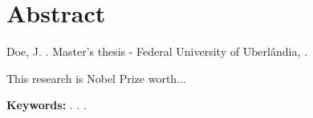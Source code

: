 

\chapter*{Abstract}


\noindent
Doe, J. \emph{\@title}. Master's thesis - Federal University of Uberlândia, \@month { } \@year.
\newline

This research is Nobel Prize worth...

\textbf{Keywords:} \@kwordA. \@kwordB. \@kwordC.
